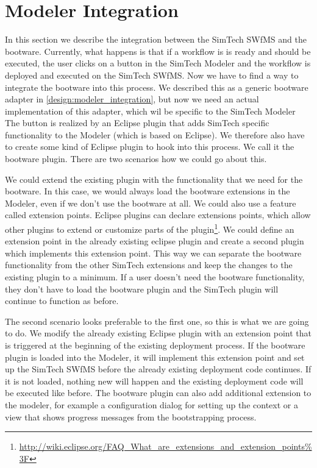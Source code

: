 \section{Modeler Integration}
\label{implementation:modeler_integration}

In this section we describe the integration between the SimTech SWfMS and the bootware.
Currently, what happens is that if a workflow is is ready and should be executed, the user clicks on a button in the SimTech Modeler and the workflow is deployed and executed on the SimTech SWfMS.
Now we have to find a way to integrate the bootware into this process.
We described this as a generic bootware adapter in \autoref{design:modeler_integration}, but now we need an actual implementation of this adapter, which wil be specific to the SimTech Modeler
The button is realized by an Eclipse plugin that adds SimTech specific functionality to the Modeler (which is based on Eclipse).
We therefore also have to create some kind of Eclipse plugin to hook into this process.
We call it the bootware plugin.
There are two scenarios how we could go about this.

We could extend the existing plugin with the functionality that we need for the bootware.
In this case, we would always load the bootware extensions in the Modeler, even if we don't use the bootware at all.
We could also use a feature called extension points.
Eclipse plugins can declare extensions points, which allow other plugins to extend or customize parts of the plugin\footnote{\url{http://wiki.eclipse.org/FAQ_What_are_extensions_and_extension_points\%3F}}.
We could define an extension point in the already existing eclipse plugin and create a second plugin which implements this extension point.
This way we can separate the bootware functionality from the other SimTech extensions and keep the changes to the existing plugin to a minimum.
If a user doesn't need the bootware functionality, they don't have to load the bootware plugin and the SimTech plugin will continue to function as before.

The second scenario looks preferable to the first one, so this is what we are going to do.
We modify the already existing Eclipse plugin with an extension point that is triggered at the beginning of the existing deployment process.
If the bootware plugin is loaded into the Modeler, it will implement this extension point and set up the SimTech SWfMS before the already existing deployment code continues.
If it is not loaded, nothing new will happen and the existing deployment code will be executed like before.
The bootware plugin can also add additional extension to the modeler, for example a configuration dialog for setting up the context or a view that shows progress messages from the bootstrapping process.
